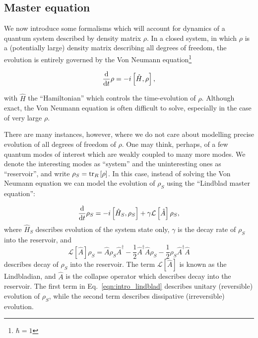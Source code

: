 \FloatBarrier
\subsection{Master equation}

We now introduce some formalisms which will account for dynamics of a quantum system described by density matrix $\rho$. In a closed system, in which $\rho$ is a (potentially large) density matrix describing all degrees of freedom, the evolution is entirely governed by the Von Neumann equation\footnote{$\hbar = 1$}

\begin{equation}
\frac{\mathrm{d}}{\mathrm{d}t} \rho = - i \left[\hat{H}, \rho \right],
\end{equation}

\noindent with $\hat{H}$ the ``Hamiltonian'' which controls the time-evolution of $\rho$. Although exact, the Von Neumann equation is often difficult to solve, especially in the case of very large $\rho$.

There are many instances, however, where we do not care about modelling precise evolution of all degrees of freedom of $\rho$. One may think, perhaps, of a few quantum modes of interest which are weakly coupled to many more modes. We denote the interesting modes as ``system'' and the uninteresting ones as ``reservoir'', and write $\rho_S = \tr_R\left[\rho\right]$. In this case, instead of solving the Von Neumann equation we can model the evolution of $\rho_S$ using the ``Lindblad master equation'':

\begin{equation}
\frac{\mathrm{d}}{\mathrm{d}t} \rho_S = - i \left[ \hat{H}_S, \rho_S \right] + \gamma \mathcal{L}\left[\hat{A}\right] \rho_S,
\end{equation}
where $\hat{H}_S$ describes evolution of the system state only, $\gamma$ is the decay rate of $\rho_S$ into the reservoir, and 
\begin{equation}\label{eqn:intro_lindblad}
\mathcal{L}\left[\hat{A}\right] \rho_S = \hat{A} \rho_S \hat{A}^\dagger - \frac{1}{2} \hat{A}^\dagger \hat{A} \rho_S - \frac{1}{2} \rho_S \hat{A}^\dagger \hat{A}
\end{equation}
describes decay of $\rho_S$ into the reservoir. The term $\mathcal{L}\left[\hat{A}\right]$ is known as the Lindbladian, and $\hat{A}$ is the collapse operator which describes decay into the reservoir. The first term in Eq.~\ref{eqn:intro_lindblad} describes unitary (reversible) evolution of $\rho_S$, while the second term describes dissipative (irreversible) evolution.

